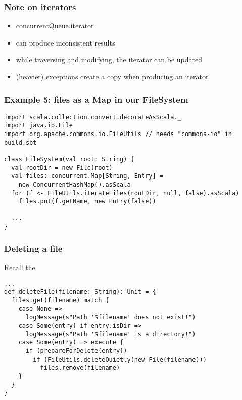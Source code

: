 \documentclass[aspectratio=169]{beamer}
\begin{document}
\begin{frame}\frametitle{Note on iterators}

\begin{itemize}
  \item concurrentQueue.iterator
  \item can produce inconsistent results
  \item while traversing and modifying, the iterator can be updated
  \item (heavier) exceptions create a copy when producing an iterator
\end{itemize}
\end{frame}


\begin{frame}[fragile]\frametitle{Example 5: files as a Map in our FileSystem}

\begin{lstlisting}[emph={execute,sleep,log,ConcurrentHashMap,files,Entry,iterateFiles}]
import scala.collection.convert.decorateAsScala._
import java.io.File
import org.apache.commons.io.FileUtils // needs "commons-io" in build.sbt

class FileSystem(val root: String) {
  val rootDir = new File(root)
  val files: concurrent.Map[String, Entry] =
    new ConcurrentHashMap().asScala
  for (f <- FileUtils.iterateFiles(rootDir, null, false).asScala)
    files.put(f.getName, new Entry(false))

  ...
}
\end{lstlisting}
\end{frame}


\begin{frame}[fragile]\frametitle{Deleting a file}

Recall the 

\begin{lstlisting}[emph={execute,sleep,log,deleteFile,files,prepareForDelete,deleteQuietly}]
...
def deleteFile(filename: String): Unit = {
  files.get(filename) match {
    case None =>
      logMessage(s"Path '$filename' does not exist!")
    case Some(entry) if entry.isDir =>
      logMessage(s"Path '$filename' is a directory!")
    case Some(entry) => execute {
      if (prepareForDelete(entry))
        if (FileUtils.deleteQuietly(new File(filename)))
          files.remove(filename)
    }
  }
}
\end{lstlisting}
\end{frame}
\end{document}
